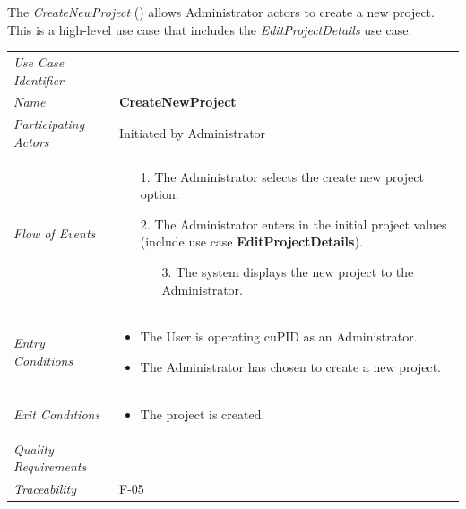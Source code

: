\documentclass[12pt,letterpaper]{article}
\begin{document}
\newpage{}

The {\it CreateNewProject} ({\bf \createnewproject{}}) allows Administrator actors to create a new project. This is a high-level use case that includes the {\it EditProjectDetails} use case.

\begin{center}
	\begin{tabu} to 
		\toprule
		Use Case Identifier & \createnewproject{} \\
		Name & {\bf CreateNewProject} \\
		Participating Actors & Initiated by Administrator \\
		Flow of Events & 
		\begin{minipage}[t]{\linewidth}
		    \begin{enumerate}
			    \item[1.] The Administrator selects the create new project option.
			    \item[2.] The Administrator enters in the initial project values (include use case \textbf{EditProjectDetails}).
			    \begin{enumerate}
				    \item[3.] The system displays the new project to the Administrator.
				\end{enumerate}
		    \end{enumerate}
	    \end{minipage} \\

		Entry Conditions &
		\begin{minipage}[t]{\linewidth}
			\begin{itemize}
			    \item The User is operating cuPID as an Administrator.
			    \item The Administrator has chosen to create a new project.
	        \end{itemize}
	    \end{minipage} \\

		Exit Conditions & 
		\begin{minipage}[t]{\linewidth}
			\begin{itemize}
			    \item The project is created.
	        \end{itemize}
	    \end{minipage}\\

		Quality Requirements & \\

		Traceability & F-05 \\
		\toprule
	\end{tabu}
\end{center}
\end{document}

